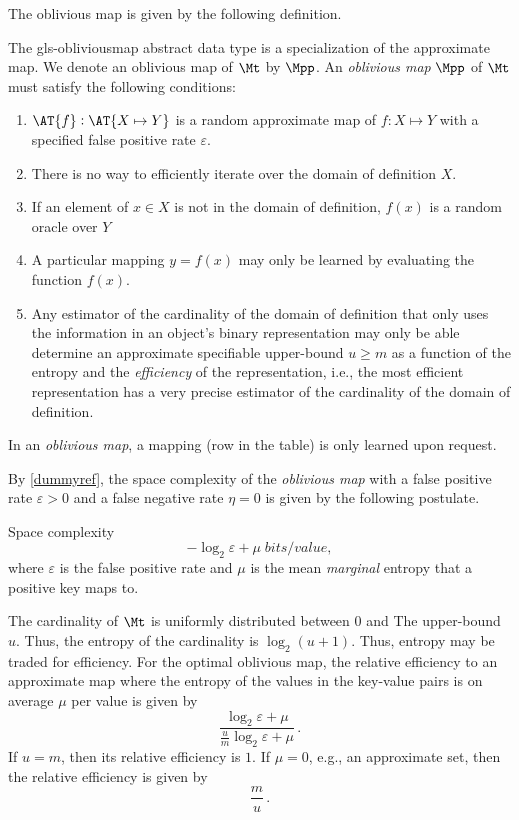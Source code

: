 \documentclass{article}
\begin{document}
The oblivious map is given by the following definition.
\begin{definition}
The \gls{gls-obliviousmap} abstract data type is a specialization of the approximate map. We denote an oblivious map of $\Mt$ by $\Mpp$. An \emph{oblivious map} $\Mpp$ of $\Mt$ must satisfy the following conditions:
\begin{enumerate}
    \item $\AT{f} : \AT{X \mapsto Y}$ is a random approximate map of $f : X \mapsto Y$ with a specified false positive rate $\varepsilon$.
    \item There is no way to efficiently iterate over the domain of definition $X$.
    \item If an element of $x \in X$ is not in the domain of definition, $f(x)$ is a random oracle over $Y$
    \item A particular mapping $y = f(x)$ may only be learned by evaluating the function $f(x)$.
    \item Any estimator of the cardinality of the domain of definition that only uses the information in an object's binary representation may only be able determine an approximate specifiable upper-bound $u \geq m$ as a function of the entropy and the \emph{efficiency} of the representation, i.e., the most efficient representation has a very precise estimator of the cardinality of the domain of definition.
\end{enumerate}
\end{definition}
In an \emph{oblivious map}, a mapping (row in the table) is only learned upon request.

By \cref{dummyref}, the space complexity of the \emph{oblivious map} with a false positive rate $\varepsilon > 0$ and a false negative rate $\eta = 0$ is given by the following postulate.
\begin{postulate}
Space complexity
\begin{equation}
    -\log_2 \varepsilon + \mu \; \si{bits \per value},
\end{equation}
where $\varepsilon$ is the false positive rate and $\mu$ is the mean \emph{marginal} entropy that a positive key maps to.
\end{postulate}

The cardinality of $\Mt$ is uniformly distributed between $0$ and The upper-bound $u$. Thus, the entropy of the cardinality is $\log_2(u+1)$. Thus, entropy may be traded for efficiency. For the optimal oblivious map, the relative efficiency to an approximate map where the entropy of the values in the key-value pairs is on average $\mu$ per value is given by
\begin{equation}
    \frac{\log_2 \varepsilon + \mu}{\frac{u}{m}\log_2 \varepsilon + \mu}\,.
\end{equation}
If $u = m$, then its relative efficiency is $1$. If $\mu = 0$, e.g., an approximate set, then the relative efficiency is given by
\begin{equation}
    \frac{m}{u}\,.
\end{equation}
\end{document}
